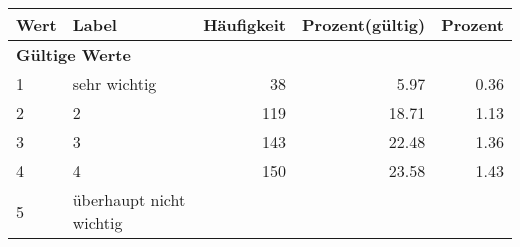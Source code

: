      \begin{longtable}{lXrrr}
     \toprule
     \textbf{Wert} & \textbf{Label} & \textbf{Häufigkeit} & \textbf{Prozent(gültig)} & \textbf{Prozent} \\
     \endhead
     \midrule
     \multicolumn{5}{l}{\textbf{Gültige Werte}}\\

     1 &
     \multicolumn{1}{X}{ sehr wichtig   } &


       \num{38} &
       \num[round-mode=places,round-precision=2]{5,97} &
         \num[round-mode=places,round-precision=2]{0,36} \\

     2 &
     \multicolumn{1}{X}{ 2   } &


       \num{119} &
       \num[round-mode=places,round-precision=2]{18,71} &
         \num[round-mode=places,round-precision=2]{1,13} \\

     3 &
     \multicolumn{1}{X}{ 3   } &


       \num{143} &
       \num[round-mode=places,round-precision=2]{22,48} &
         \num[round-mode=places,round-precision=2]{1,36} \\

     4 &
     \multicolumn{1}{X}{ 4   } &


       \num{150} &
       \num[round-mode=places,round-precision=2]{23,58} &
         \num[round-mode=places,round-precision=2]{1,43} \\

     5 &
     \multicolumn{1}{X}{ überhaupt nicht wichtig   } &



\end{longtable}
